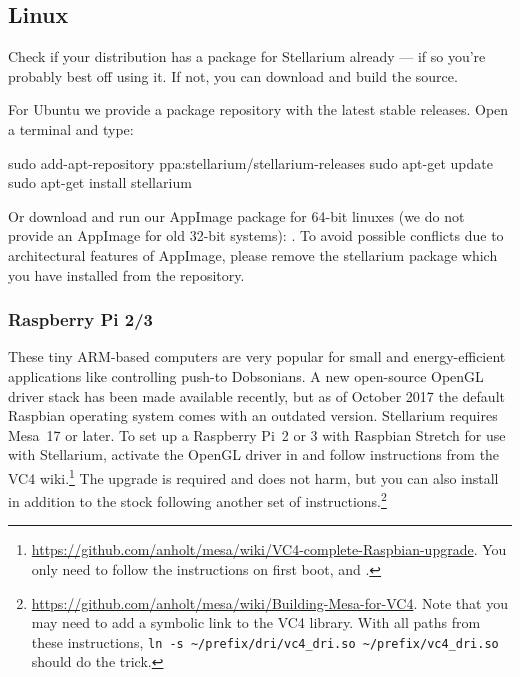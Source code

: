 \subsection{Linux}
\label{sec:GettingStarted:Installation:Linux}

Check if your distribution has a package for Stellarium already --- if
so you're probably best off using it. If not, you can download and build
the source.

For Ubuntu we provide a package repository with the latest stable
releases. Open a terminal and type:

\begin{commands}
sudo add-apt-repository ppa:stellarium/stellarium-releases
sudo apt-get update
sudo apt-get install stellarium
\end{commands}

Or download and run our AppImage package for 64-bit linuxes (we do not
provide an AppImage for old 32-bit systems):
. To avoid possible
conflicts due to architectural features of AppImage, please remove
the stellarium package which you have installed from the repository.

\subsubsection{Raspberry Pi 2/3}
These tiny ARM-based computers are very popular for small and energy-efficient applications like controlling push-to Dobsonians. 
A new open-source OpenGL driver stack has been made available recently, but as of October 2017 the default 
Raspbian operating system comes with an outdated version. Stellarium requires Mesa~17 or later. 
To set up a Raspberry Pi~2 or 3 with Raspbian Stretch for use with Stellarium, activate the OpenGL driver in 
 and follow instructions from the VC4 wiki.\footnote{%
	\url{https://github.com/anholt/mesa/wiki/VC4-complete-Raspbian-upgrade}. You only need to follow the instructions on first boot,  and .} 
The  upgrade is required and does not harm, but you can also install  in addition to the stock  
following another set of instructions.\footnote{\url{https://github.com/anholt/mesa/wiki/Building-Mesa-for-VC4}. 
	Note that you may need to add a symbolic link to the VC4 library. With all paths from these instructions, 
	\verb|ln -s ~/prefix/dri/vc4_dri.so ~/prefix/vc4_dri.so| should do the trick.}

